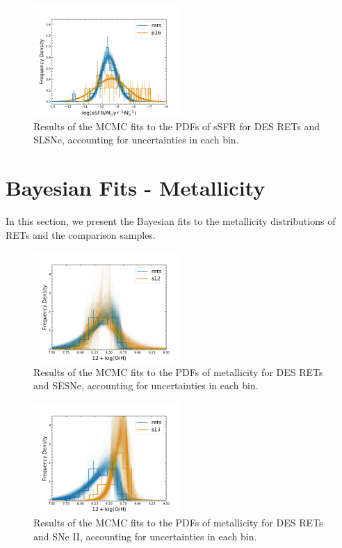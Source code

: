 \documentclass[fleqn,usenatbib,]{mnras}
\begin{document}
\begin{figure}
\includegraphics[width=0.5\textwidth]{mc_figs/rets_p16_histfit_ssfr_final.png}
\caption{Results of the MCMC fits to the PDFs of sSFR for DES RETs and SLSNe, accounting for uncertainties in each bin.
\label{fig:histfit_ssfr_p16}}
\end{figure}

\section{Bayesian Fits - Metallicity}
\label{app:c}
In this section, we present the Bayesian fits to the metallicity distributions of RETs and the comparison samples.
\begin{figure}
\includegraphics[width=0.5\textwidth]{mc_figs/rets_s12_OH_histfit_final.png}
\caption{Results of the MCMC fits to the PDFs of metallicity for DES RETs and SESNe, accounting for uncertainties in each bin.
\label{fig:histfit_oh_s12}}
\end{figure}

\begin{figure}
\includegraphics[width=0.5\textwidth]{mc_figs/rets_s13_OH_histfit_final.png}
\caption{Results of the MCMC fits to the PDFs of metallicity for DES RETs and SNe II, accounting for uncertainties in each bin.
\label{fig:histfit_oh_s13}}
\end{figure}
\end{document}
